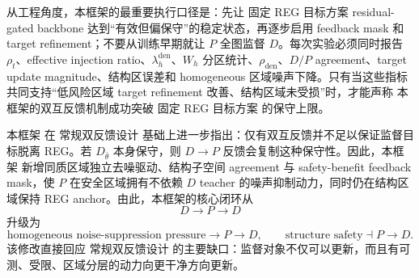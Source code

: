 \documentclass[11pt,a4paper,UTF8,fontset=fandol]{ctexart}
\theoremstyle{definition}
\begin{document}
从工程角度，本框架的最重要执行口径是：先让 固定 REG 目标方案 residual-gated backbone 达到“有效但偏保守”的稳定状态，再逐步启用 feedback mask 和 target refinement；不要从训练早期就让 $P$ 全图监督 $D$。每次实验必须同时报告 $\rho_t$、effective injection ratio、$\lambda_h^{\mathrm{den}}$、$W_h$ 分区统计、$\rho_{\mathrm{den}}$、$D/P$ agreement、target update magnitude、结构区误差和 homogeneous 区域噪声下降。只有当这些指标共同支持“低风险区域 target refinement 改善、结构区域未受损”时，才能声称 本框架的双互反馈机制成功突破 固定 REG 目标方案 的保守上限。


本框架 在 常规双反馈设计 基础上进一步指出：仅有双互反馈并不足以保证监督目标脱离 REG。若 $D_{\bar\theta}$ 本身保守，则 $D\to P$ 反馈会复制这种保守性。因此，本框架 新增同质区域独立去噪驱动、结构子空间 agreement 与 safety-benefit feedback mask，使 $P$ 在安全区域拥有不依赖 $D$ teacher 的噪声抑制动力，同时仍在结构区域保持 REG anchor。由此，本框架的核心闭环从
\begin{equation}
    D\to P\to D
\end{equation}
升级为
\begin{equation}
    \text{homogeneous noise-suppression pressure}\to P\to D,
    \qquad
    \text{structure safety}\dashv P\to D.
\end{equation}
该修改直接回应 常规双反馈设计 的主要缺口：监督对象不仅可以更新，而且有可测、受限、区域分层的动力向更干净方向更新。
\end{document}
